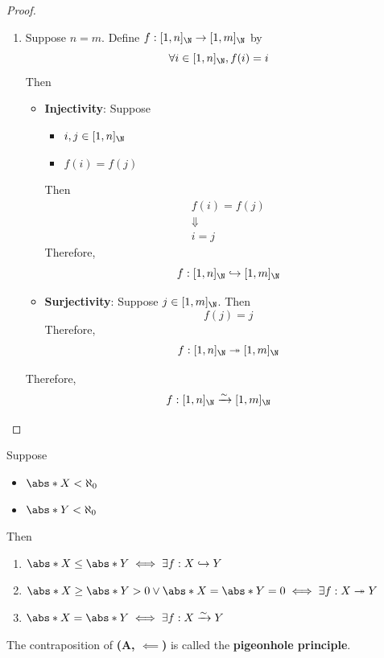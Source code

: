 \begin{proof}
\begin{enumerate}[label=\textbf{(\Alph*)}]
\begin{itemize}
                  Therefore,
                  \[
                    f: [1, n]_{\N} \twoheadrightarrow [1, m]_{\N}
                  \]
          \end{itemize}
    \item Suppose $n = m$. Define $f: [1, n]_{\N} \to [1, m]_{\N}$ by
          \[
            \forall i \in [1, n]_{\N}, f(i) = i
          \]
          Then
          \begin{itemize}
            \item \textbf{Injectivity}: Suppose
                  \begin{itemize}
                    \item $i, j \in [1, n]_{\N}$
                    \item $f(i) = f(j)$
                  \end{itemize}
                  Then
                  \[
                    \begin{array}{c}
                      f(i) = f(j) \\
                      \Downarrow  \\
                      i = j
                    \end{array}
                  \]
                  Therefore,
                  \[
                    f: [1, n]_{\N} \hookrightarrow [1, m]_{\N}
                  \]
            \item \textbf{Surjectivity}: Suppose $j \in [1, m]_{\N}$. Then
                  \[
                    f(j) = j
                  \]
                  Therefore,
                  \[
                    f: [1, n]_{\N} \twoheadrightarrow [1, m]_{\N}
                  \]
          \end{itemize}
          Therefore,
          \[
            f: [1, n]_{\N} \xrightarrow{\sim} [1, m]_{\N}
          \]
  \end{enumerate}
\end{proof}

\bigskip

\begin{theorem} \label{an:thm:properties-of-cardinality}
  Suppose
  \begin{itemize}
    \item $\abs*{X} < \aleph_{0}$
    \item $\abs*{Y} < \aleph_{0}$
  \end{itemize}
  Then
  \begin{enumerate}[label=\textbf{(\Alph*)}]
    \item $\abs*{X} \leq \abs*{Y} \iff \exists f: X \hookrightarrow Y$
    \item $\abs*{X} \geq \abs*{Y} > 0 \lor \abs*{X} = \abs*{Y} = 0
            \iff \exists f: X \twoheadrightarrow Y$
    \item $\abs*{X} = \abs*{Y} \iff \exists f: X \xrightarrow{\sim} Y$
  \end{enumerate}
  The contraposition of \textbf{(A, $\impliedby$)} is called the \textbf{pigeonhole principle}.
\end{theorem}

